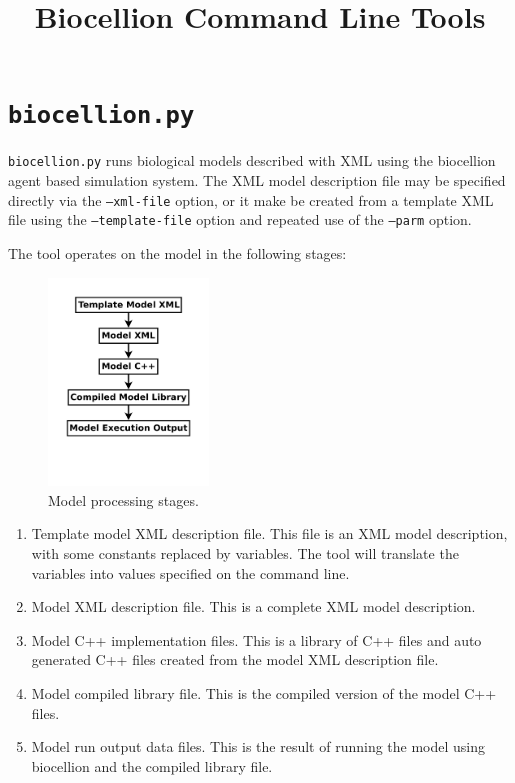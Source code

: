 \documentclass{article}
\newcommand{\inlinecode}[1]{\texttt{#1}}
\begin{document}
\title{Biocellion Command Line Tools}
\date{}
\author{}
\maketitle

\section{\inlinecode{biocellion.py}}

\inlinecode{biocellion.py} runs biological models described with XML using the
biocellion agent based simulation system.  The XML model description file may be
specified directly via the \inlinecode{--xml-file} option, or it make be created
from a template XML file using the \inlinecode{--template-file} option and repeated
use of the \inlinecode{--parm} option.


The tool operates on the model in the following stages:
\begin{figure}
  \includegraphics[width=0.38\textwidth]{Stages.pdf}
  \caption{Model processing stages.}
\end{figure}
\begin{enumerate}
\item Template model XML description file.  This file is an XML model description, with some constants replaced by variables.  The tool will translate the variables into values specified on the command line.
\item Model XML description file.  This is a complete XML model description.
\item Model C++ implementation files.  This is a library of C++ files and auto generated C++ files created from the model XML description file.
\item Model compiled library file.  This is the compiled version of the model C++ files.
\item Model run output data files.  This is the result of running the model using biocellion and the compiled library file.
\end{enumerate}
\end{document}

